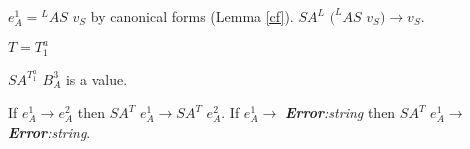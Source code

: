 \begin{case}
\begin{subcase}
$e_{A}^{1}={^{L}A}S$ $v_{S}$ by canonical forms (Lemma \ref{cf}).  $SA^{L}$ $(^{L}AS$ $v_{S})\rightarrow v_{S}$.
\end{subcase}
\begin{subcase}
$T=T_{1}^{a}$

$SA^{T_{1}^{a}}$ $B_{A}^{3}$ is a value.
\end{subcase}
If $e_{A}^{1}\rightarrow e_{A}^{2}$ then $SA^{T}$ $e_{A}^{1}\rightarrow SA^{T}$ $e_{A}^{2}$.  If $e_{A}^{1}\rightarrow$ \emph{\textbf{Error}:\;string} then $SA^{T}$ $e_{A}^{1}\rightarrow$ \emph{\textbf{Error}:\;string}.
\end{case}